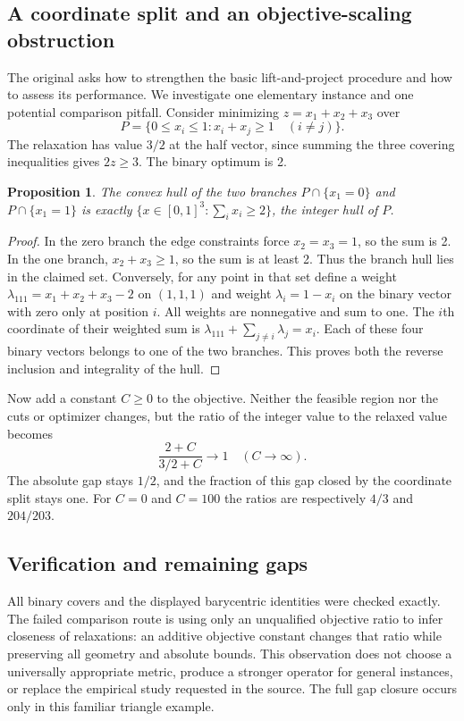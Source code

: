 \documentclass[11pt]{article}
\newtheorem{proposition}{Proposition}
\begin{document}
\subsection{A coordinate split and an objective-scaling obstruction}
The original asks how to strengthen the basic lift-and-project procedure and how to assess its performance. We investigate one elementary instance and one potential comparison pitfall. Consider minimizing $z=x_1+x_2+x_3$ over
\[
P=\{0\le x_i\le1:x_i+x_j\ge1\quad(i\ne j)\}.
\]
The relaxation has value $3/2$ at the half vector, since summing the three covering inequalities gives $2z\ge3$. The binary optimum is 2.
\begin{proposition}
The convex hull of the two branches $P\cap\{x_1=0\}$ and $P\cap\{x_1=1\}$ is exactly $\{x\in[0,1]^3:\sum_i x_i\ge2\}$, the integer hull of $P$.
\end{proposition}
\begin{proof}
In the zero branch the edge constraints force $x_2=x_3=1$, so the sum is 2. In the one branch, $x_2+x_3\ge1$, so the sum is at least 2. Thus the branch hull lies in the claimed set. Conversely, for any point in that set define a weight $\lambda_{111}=x_1+x_2+x_3-2$ on $(1,1,1)$ and weight $\lambda_i=1-x_i$ on the binary vector with zero only at position $i$. All weights are nonnegative and sum to one. The $i$th coordinate of their weighted sum is $\lambda_{111}+\sum_{j\ne i}\lambda_j=x_i$. Each of these four binary vectors belongs to one of the two branches. This proves both the reverse inclusion and integrality of the hull.
\end{proof}
Now add a constant $C\ge0$ to the objective. Neither the feasible region nor the cuts or optimizer changes, but the ratio of the integer value to the relaxed value becomes
\[
\frac{2+C}{3/2+C}\longrightarrow1\quad(C\to\infty).
\]
The absolute gap stays $1/2$, and the fraction of this gap closed by the coordinate split stays one. For $C=0$ and $C=100$ the ratios are respectively $4/3$ and $204/203$.
\subsection{Verification and remaining gaps}
All binary covers and the displayed barycentric identities were checked exactly. The failed comparison route is using only an unqualified objective ratio to infer closeness of relaxations: an additive objective constant changes that ratio while preserving all geometry and absolute bounds. This observation does not choose a universally appropriate metric, produce a stronger operator for general instances, or replace the empirical study requested in the source. The full gap closure occurs only in this familiar triangle example.
\end{document}
